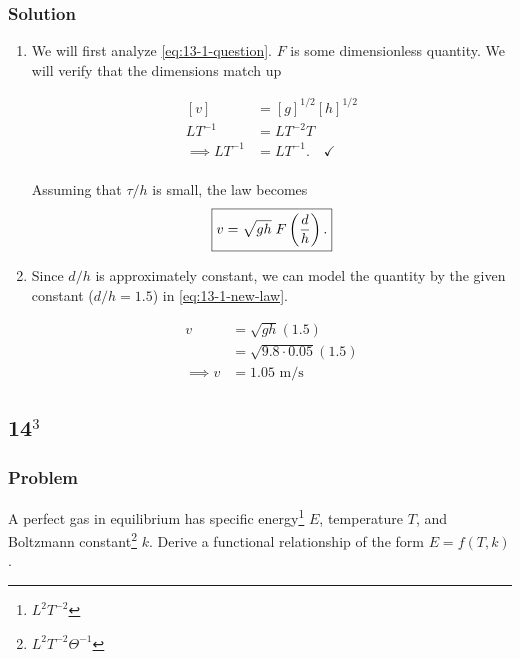 \documentclass[12pt]{article}
\begin{document}
  \subsubsection*{Solution}
  \begin{enumerate}
  \item We will first analyze \cref{eq:13-1-question}. $F$ is some dimensionless
    quantity. We will verify that the dimensions match up

    \begin{equation}
      \begin{aligned}
        [v] &= {[g]}^{1/2}{[h]}^{1/2} \\
        LT^{-1} &= LT^{-2}T \\
        \implies LT^{-1} &= LT^{-1}. \quad \checkmark \\
      \end{aligned}
    \end{equation}

    Assuming that $\tau/h$ is small, the law becomes
    \begin{equation} \boxed {
        \label{eq:13-1-new-law}
        v=\sqrt{gh}\; F\left(\frac{d}{h}\right).
      }
    \end{equation}

  \item Since $d/h$ is approximately constant, we can model the quantity by the
    given constant ($d/h=1.5$) in \cref{eq:13-1-new-law}.

    \begin{equation} \boxed{
        \begin{aligned}
          v &= \sqrt{gh}(1.5) \\
          &= \sqrt{9.8\cdot0.05}(1.5) \\
          \implies v &= 1.05 \text{ m/s}
        \end{aligned}
      }
    \end{equation}
  \end{enumerate}

\subsection{14$^3$}
  \subsubsection*{Problem}
  A perfect gas in equilibrium has specific energy\footnote{$L^2T^{-2}$} $E$,
  temperature $T$, and Boltzmann constant\footnote{$L^2T^{-2}\Theta^{-1}$} $k$.
  Derive a functional relationship of the form $E=f(T,k)$.
\end{document}
